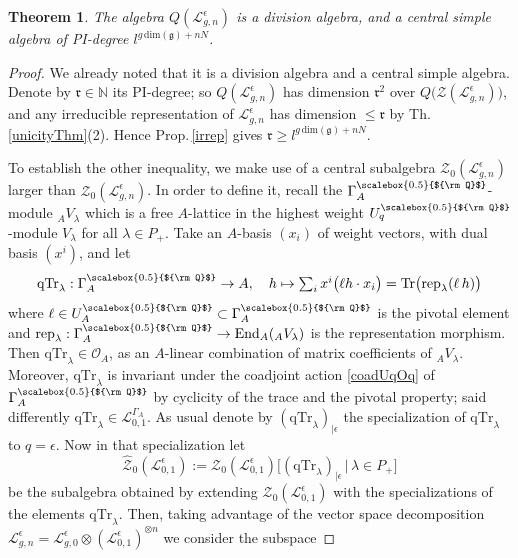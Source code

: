 \documentclass[11pt]{amsart}
\newtheorem{teo}{Theorem}[section]
\newcommand{\e}{\epsilon}
\newcommand{\mn}{\mathbb{N}}
\newcommand{\Ll}{\mathcal{L}}
\newcommand{\Q}{{\scalebox{0.5}{${\rm Q}$}}}
\begin{document}
\begin{teo}\label{Lgnteo1}
The algebra $Q(\Ll_{g,n}^{\e})$ is a division algebra, and a central simple algebra of PI-degree $l^{g\,\mathrm{dim}(\mathfrak{g})+nN}$.
\end{teo}
\begin{proof}
We already noted that it is a division algebra and a central simple algebra. Denote by $\mathfrak{r}\in \mn$ its PI-degree; so $Q(\Ll_{g,n}^{\e})$ has dimension $\mathfrak{r}^2$ over $Q\bigl(\mathcal{Z}(\Ll_{g,n}^{\e})\bigr)$, and any irreducible representation of $\Ll_{g,n}^{\e}$ has dimension $\leq \mathfrak{r}$ by Th.\,\ref{unicityThm}(2). Hence Prop.\,\ref{irrep} gives $\mathfrak{r} \geq l^{g\,\mathrm{dim}(\mathfrak{g})+nN}$. 

To establish the other inequality, we make use of a central subalgebra $\hat{\mathcal{Z}_0}(\mathcal{L}_{g,n}^\e)$ larger than $\mathcal{Z}_0(\mathcal{L}_{g,n}^\e)$. In order to define it, recall the $\Gamma_A^\Q$-module $_AV_{\lambda}$ which is a free $A$-lattice in the highest weight $U_q^\Q$-module $V_\lambda$ for all $\lambda \in P_+$. Take an $A$-basis $(x_i)$ of weight vectors, with dual basis $(x^i)$, and let
\begin{equation}\label{casimirElmtsL01}
\textstyle \mathrm{qTr}_\lambda : \Gamma_A^\Q \to A, \quad h \mapsto \sum_i x^i\bigl( \ell h \cdot x_i \bigr) = \mathrm{Tr}\bigl( \mathrm{rep}_\lambda(\ell\,h) \bigr)
\end{equation}
where $\ell \in U_A^\Q \subset \Gamma_A^\Q$ is the pivotal element and $\mathrm{rep}_\lambda : \Gamma_A^\Q \to \mathrm{End}_A(_AV_\lambda)$ is the representation morphism. Then $\mathrm{qTr}_\lambda \in \mathcal{O}_A$, as an $A$-linear combination of matrix coefficients of $_AV_\lambda$. Moreover, $\mathrm{qTr}_\lambda$ is invariant under the coadjoint action \eqref{coadUqOq} of $\Gamma_A^\Q$ by cyclicity of the trace and the pivotal property; said differently $\mathrm{qTr}_\lambda \in \mathcal{L}_{0,1}^{\Gamma_A}$. As usual denote by $(\mathrm{qTr}_\lambda)_{|\e}$ the specialization of $\mathrm{qTr}_\lambda$ to $q=\e$. Now in that specialization let
\[ \hat{\mathcal{Z}}_0(\mathcal{L}_{0,1}^\e) := \mathcal{Z}_0(\mathcal{L}_{0,1}^\e)\bigl[ (\mathrm{qTr}_\lambda)_{|\e} \,\big|\, \lambda \in P_+ \bigr] \]
be the subalgebra obtained by extending $\mathcal{Z}_0(\mathcal{L}_{0,1}^\e)$ with the specializations of the elements $\mathrm{qTr}_\lambda$. Then, taking advantage of the vector space decomposition $\mathcal{L}_{g,n}^\e = \mathcal{L}_{g,0}^\e \otimes (\mathcal{L}_{0,1}^\e)^{\otimes n}$ we consider the subspace

\end{proof}
\end{document}
